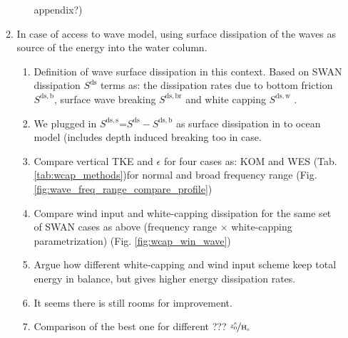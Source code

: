 \documentclass[final]{svjour3}
\begin{document}
\begin{enumerate}
\begin{enumerate}
\begin{enumerate}
          appendix?)
      \end{enumerate}
      \item In case of access to wave model, using surface dissipation of the 
       waves as source of the energy into the water column.
          \begin{enumerate}
              \item Definition of wave surface dissipation in this context.
              Based on SWAN dissipation $S^{\mathrm{ds}}$ terms as: the dissipation rates
              due to bottom friction $S^{\mathrm{ds,b}}$,
              surface wave breaking $S^{\mathrm{ds,br}}$ and white capping $S^{\mathrm{ds,w}}$
              \citep{booij2004swan}. 
              \item We plugged in $S^{\mathrm{ds,s}}$=$S^{\mathrm{ds}}
              -S^{\mathrm{ds,b}}$ as surface dissipation in to ocean model
              (includes depth induced breaking too in case.
              \item Compare vertical TKE and $\epsilon$ for four cases as: KOM
              and WES (Tab. \ref{tab:wcap_methods})for normal and broad frequency range (Fig.
              \ref{fig:wave_freq_range_compare_profile})
              \item Compare wind input and white-capping dissipation for the same
              set of SWAN cases as above (frequency range $\times$ white-capping
              parametrization) (Fig. \ref{fig:wcap_win_wave}) 
              \item Argue how different white-capping and wind input scheme
              keep total energy in balance, but gives higher energy
              dissipation rates. 
              \item It seems there is still rooms for improvement.
              \item Comparison of the best one for different ???
              $\nicefrac{z_0^\mathrm{s}}{\mathrm{H}_\mathrm{s}}$
          \end{enumerate} 


\end{enumerate}
\end{enumerate}
\end{document}
